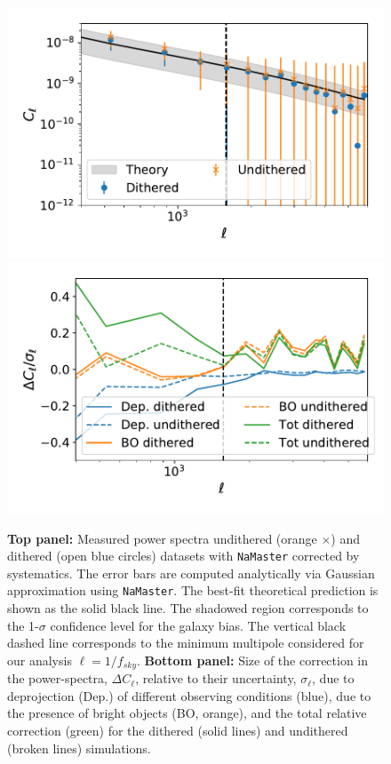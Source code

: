 \documentclass[twocolumn]{aastex62}
\begin{document}
\begin{figure}
\centering
\includegraphics[width=0.9\columnwidth]{Cl_results_2019_comp}
\includegraphics[width=0.9\columnwidth]{systematics_comp_abs}
\caption{{\bf Top panel:} Measured power spectra undithered (orange $\times$) and dithered (open blue circles) datasets with \texttt{NaMaster} corrected by systematics. The error bars are computed analytically via Gaussian approximation using \texttt{NaMaster}. The best-fit theoretical prediction is shown as the solid black line. The shadowed region corresponds to the 1-$\sigma$ confidence level for the galaxy bias. The vertical black dashed line corresponds to the minimum multipole considered for our analysis $\ell = 1/f_{sky}$. {\bf Bottom panel:} Size of the correction in the power-spectra, $\Delta C_{\ell}$, relative to their uncertainty, $\sigma_{\ell}$, due to deprojection (Dep.) of different observing conditions (blue), due to the presence of bright objects (BO, orange), and the total relative correction (green) for the dithered (solid lines) and undithered (broken lines) simulations.}
\label{fig:power_spectra}
\end{figure}
\fi
\end{document}
